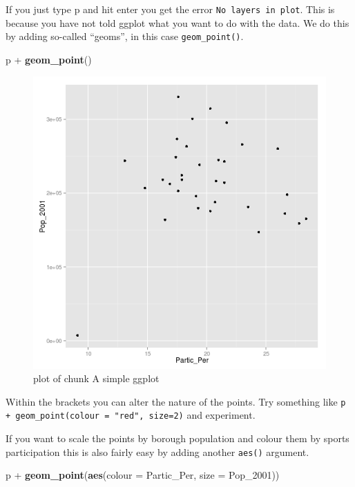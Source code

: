 \documentclass[]{article}
\newenvironment{Shaded}{}{}
\newcommand{\KeywordTok}[1]{\textcolor[rgb]{0.00,0.44,0.13}{\textbf{{#1}}}}
\newcommand{\DataTypeTok}[1]{\textcolor[rgb]{0.56,0.13,0.00}{{#1}}}
\newcommand{\StringTok}[1]{\textcolor[rgb]{0.25,0.44,0.63}{{#1}}}
\newcommand{\NormalTok}[1]{{#1}}
\begin{document}
If you just type p and hit enter you get the error
\texttt{No layers in plot}. This is because you have not told ggplot
what you want to do with the data. We do this by adding so-called
``geoms'', in this case \texttt{geom\_point()}.

\begin{Shaded}
\begin{Highlighting}[]
\NormalTok{p +}\StringTok{ }\KeywordTok{geom_point}\NormalTok{()}
\end{Highlighting}
\end{Shaded}

\begin{figure}[htbp]
\centering
\includegraphics{figure/A_simple_ggplot.png}
\caption{plot of chunk A simple ggplot}
\end{figure}

Within the brackets you can alter the nature of the points. Try
something like \texttt{p + geom\_point(colour = "red", size=2)} and
experiment.

If you want to scale the points by borough population and colour them by
sports participation this is also fairly easy by adding another
\texttt{aes()} argument.

\begin{Shaded}
\begin{Highlighting}[]
\NormalTok{p +}\StringTok{ }\KeywordTok{geom_point}\NormalTok{(}\KeywordTok{aes}\NormalTok{(}\DataTypeTok{colour =} \NormalTok{Partic_Per, }\DataTypeTok{size =} \NormalTok{Pop_2001))}
\end{Highlighting}
\end{Shaded}
\end{document}
